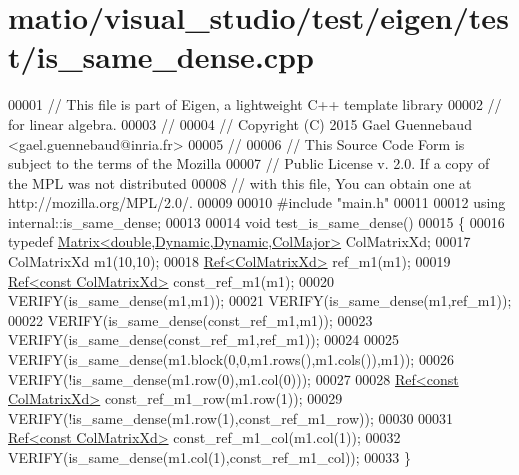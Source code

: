 \hypertarget{matio_2visual__studio_2test_2eigen_2test_2is__same__dense_8cpp_source}{}\section{matio/visual\+\_\+studio/test/eigen/test/is\+\_\+same\+\_\+dense.cpp}
\label{matio_2visual__studio_2test_2eigen_2test_2is__same__dense_8cpp_source}

\begin{DoxyCode}
00001 \textcolor{comment}{// This file is part of Eigen, a lightweight C++ template library}
00002 \textcolor{comment}{// for linear algebra.}
00003 \textcolor{comment}{//}
00004 \textcolor{comment}{// Copyright (C) 2015 Gael Guennebaud <gael.guennebaud@inria.fr>}
00005 \textcolor{comment}{//}
00006 \textcolor{comment}{// This Source Code Form is subject to the terms of the Mozilla}
00007 \textcolor{comment}{// Public License v. 2.0. If a copy of the MPL was not distributed}
00008 \textcolor{comment}{// with this file, You can obtain one at http://mozilla.org/MPL/2.0/.}
00009 
00010 \textcolor{preprocessor}{#include "main.h"}
00011 
00012 \textcolor{keyword}{using} internal::is\_same\_dense;
00013 
00014 \textcolor{keywordtype}{void} test\_is\_same\_dense()
00015 \{
00016   \textcolor{keyword}{typedef} \hyperlink{group___core___module_class_eigen_1_1_matrix}{Matrix<double,Dynamic,Dynamic,ColMajor>} ColMatrixXd;
00017   ColMatrixXd m1(10,10);
00018   \hyperlink{group___core___module_class_eigen_1_1_ref}{Ref<ColMatrixXd>} ref\_m1(m1);
00019   \hyperlink{group___core___module_class_eigen_1_1_ref}{Ref<const ColMatrixXd>} const\_ref\_m1(m1);
00020   VERIFY(is\_same\_dense(m1,m1));
00021   VERIFY(is\_same\_dense(m1,ref\_m1));
00022   VERIFY(is\_same\_dense(const\_ref\_m1,m1));
00023   VERIFY(is\_same\_dense(const\_ref\_m1,ref\_m1));
00024   
00025   VERIFY(is\_same\_dense(m1.block(0,0,m1.rows(),m1.cols()),m1));
00026   VERIFY(!is\_same\_dense(m1.row(0),m1.col(0)));
00027   
00028   \hyperlink{group___core___module_class_eigen_1_1_ref}{Ref<const ColMatrixXd>} const\_ref\_m1\_row(m1.row(1));
00029   VERIFY(!is\_same\_dense(m1.row(1),const\_ref\_m1\_row));
00030   
00031   \hyperlink{group___core___module_class_eigen_1_1_ref}{Ref<const ColMatrixXd>} const\_ref\_m1\_col(m1.col(1));
00032   VERIFY(is\_same\_dense(m1.col(1),const\_ref\_m1\_col));
00033 \}
\end{DoxyCode}

